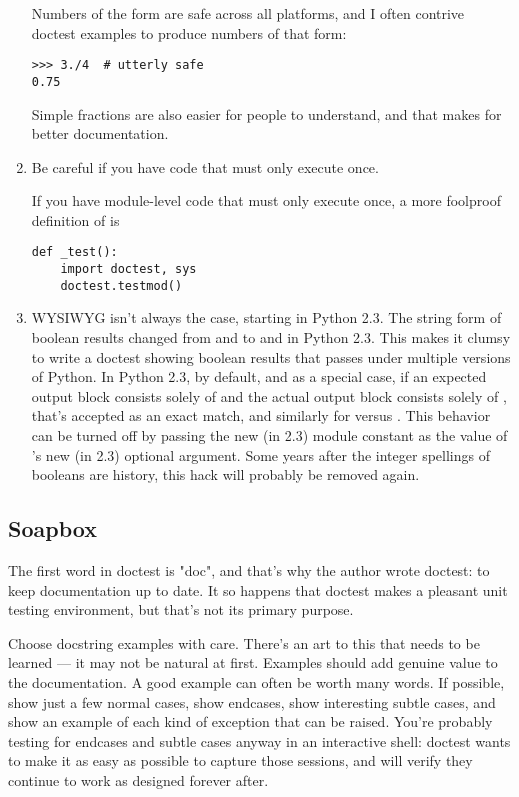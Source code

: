 \begin{enumerate}
Numbers of the form  are safe across all platforms, and I
often contrive doctest examples to produce numbers of that form:

\begin{verbatim}
>>> 3./4  # utterly safe
0.75
\end{verbatim}

Simple fractions are also easier for people to understand, and that makes
for better documentation.

\item Be careful if you have code that must only execute once.

If you have module-level code that must only execute once, a more foolproof
definition of  is

\begin{verbatim}
def _test():
    import doctest, sys
    doctest.testmod()
\end{verbatim}

\item WYSIWYG isn't always the case, starting in Python 2.3.  The
  string form of boolean results changed from  and
   to  and  in Python 2.3.
  This makes it clumsy to write a doctest showing boolean results that
  passes under multiple versions of Python.  In Python 2.3, by default,
  and as a special case, if an expected output block consists solely
  of  and the actual output block consists solely of
  , that's accepted as an exact match, and similarly for
   versus .  This behavior can be turned off by
  passing the new (in 2.3) module constant
   as the value of 's
  new (in 2.3) optional  argument.  Some years after
  the integer spellings of booleans are history, this hack will
  probably be removed again.

\end{enumerate}


\subsection{Soapbox}

The first word in doctest is "doc", and that's why the author wrote
doctest:  to keep documentation up to date.  It so happens that doctest
makes a pleasant unit testing environment, but that's not its primary
purpose.

Choose docstring examples with care.  There's an art to this that needs to
be learned --- it may not be natural at first.  Examples should add genuine
value to the documentation.  A good example can often be worth many words.
If possible, show just a few normal cases, show endcases, show interesting
subtle cases, and show an example of each kind of exception that can be
raised.  You're probably testing for endcases and subtle cases anyway in an
interactive shell:  doctest wants to make it as easy as possible to capture
those sessions, and will verify they continue to work as designed forever
after.

